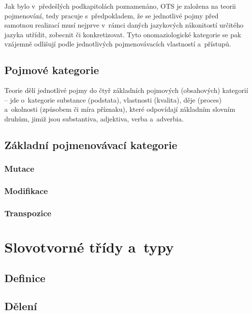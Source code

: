 Jak bylo v~předešlých podkapitolách poznamenáno, OTS je založena na
teorii pojmenování, tedy pracuje s~předpokladem, že se jednotlivé pojmy
před samotnou realizací musí nejprve v~rámci daných jazykových
zákonitostí určitého jazyka utřídit, zobecnit či konkretizovat. Tyto
onomaziologické kategorie se pak vzájemně odlišují podle jednotlivých
pojmenovávacích vlastností a~přístupů.~\parencite[29]{dokulil62}

\hypertarget{pojmovuxe9-kategorie}{%
\subsection{Pojmové kategorie}\label{pojmovuxe9-kategorie}}

Teorie dělí jednotlivé pojmy do čtyř základních pojmových (obsahových)
kategorií -- jde o~kategorie substance (podstata), vlastnosti (kvalita),
děje (proces) a~okolnosti (způsobem či míra příznaku), které odpovídají
základním slovním druhům, jimiž jsou substantiva, adjektiva, verba
a~adverbia.~\parencite[102]{dokulil00}

\hypertarget{zuxe1kladnuxed-pojmenovuxe1vacuxed-kategorie}{%
\subsection{Základní pojmenovávací
kategorie}\label{zuxe1kladnuxed-pojmenovuxe1vacuxed-kategorie}}

\hypertarget{mutace}{%
\subsubsection{Mutace}\label{mutace}}

\hypertarget{modifikace}{%
\subsubsection{Modifikace}\label{modifikace}}

\hypertarget{transpozice}{%
\subsubsection{Transpozice}\label{transpozice}}

\hypertarget{slovotvornuxe9-tux159uxeddy-a-typy}{%
\section{Slovotvorné třídy
a~typy}\label{slovotvornuxe9-tux159uxeddy-a-typy}}

\hypertarget{definice}{%
\subsection{Definice}\label{definice}}

\hypertarget{dux11blenuxed}{%
\subsection{Dělení}\label{dux11blenuxed}}
